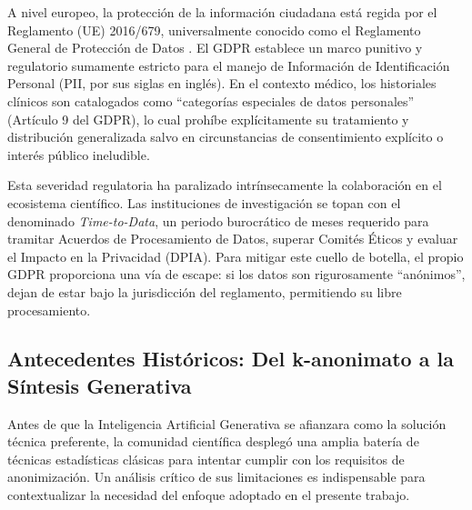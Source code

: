 A nivel europeo, la protección de la información ciudadana está regida por el Reglamento (UE) 2016/679, universalmente conocido como el Reglamento General de Protección de Datos \parencite{gdpr2016}. El GDPR establece un marco punitivo y regulatorio sumamente estricto para el manejo de Información de Identificación Personal (PII, por sus siglas en inglés). En el contexto médico, los historiales clínicos son catalogados como ``categorías especiales de datos personales'' (Artículo 9 del GDPR), lo cual prohíbe explícitamente su tratamiento y distribución generalizada salvo en circunstancias de consentimiento explícito o interés público ineludible.

Esta severidad regulatoria ha paralizado intrínsecamente la colaboración en el ecosistema científico. Las instituciones de investigación se topan con el denominado \textit{Time-to-Data}, un periodo burocrático de meses requerido para tramitar Acuerdos de Procesamiento de Datos, superar Comités Éticos y evaluar el Impacto en la Privacidad (DPIA). Para mitigar este cuello de botella, el propio GDPR proporciona una vía de escape: si los datos son rigurosamente ``anónimos'', dejan de estar bajo la jurisdicción del reglamento, permitiendo su libre procesamiento.

\subsection{Antecedentes Históricos: Del k-anonimato a la Síntesis Generativa}

Antes de que la Inteligencia Artificial Generativa se afianzara como la solución técnica preferente, la comunidad científica desplegó una amplia batería de técnicas estadísticas clásicas para intentar cumplir con los requisitos de anonimización. Un análisis crítico de sus limitaciones es indispensable para contextualizar la necesidad del enfoque adoptado en el presente trabajo.

